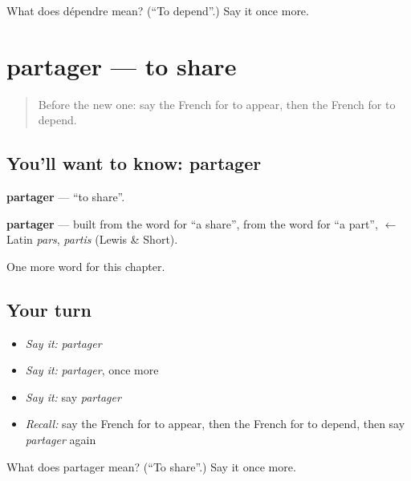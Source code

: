 \begin{tcolorbox}[breakable,colback=teal!4,colframe=teal!35!black,title={Before you move on}]
What does dépendre mean? (\textquotedblleft{}To depend\textquotedblright{}.) Say it once more.
\end{tcolorbox}
\section[partager]{partager — to share}

\label{lesson:FR-C179-partager}



\begin{quote}
Before the new one: say the French for to appear, then the French for to depend.
\end{quote}

\subsection*{You'll want to know: partager}
\textbf{partager} — \textquotedblleft{}to share\textquotedblright{}.

\begin{cousinweb}
\textbf{partager} — built from the word for \textquotedblleft{}a share\textquotedblright{}, from the word for \textquotedblleft{}a part\textquotedblright{}, $\leftarrow$ Latin \emph{pars}, \emph{partis} (Lewis \& Short).
\end{cousinweb}

\begin{grammarlens}[title={What you've built}]
One more word for this chapter.
\end{grammarlens}

\subsection*{Your turn}
\begin{itemize}
\raggedright
  \item \emph{Say it:} \emph{partager}
  \item \emph{Say it:} \emph{partager}, once more
  \item \emph{Say it:} say \emph{partager}
  \item \emph{Recall:} say the French for to appear, then the French for to depend, then say \emph{partager} again
\end{itemize}

\begin{tcolorbox}[breakable,colback=teal!4,colframe=teal!35!black,title={Before you move on}]
What does partager mean? (\textquotedblleft{}To share\textquotedblright{}.) Say it once more.
\end{tcolorbox}

